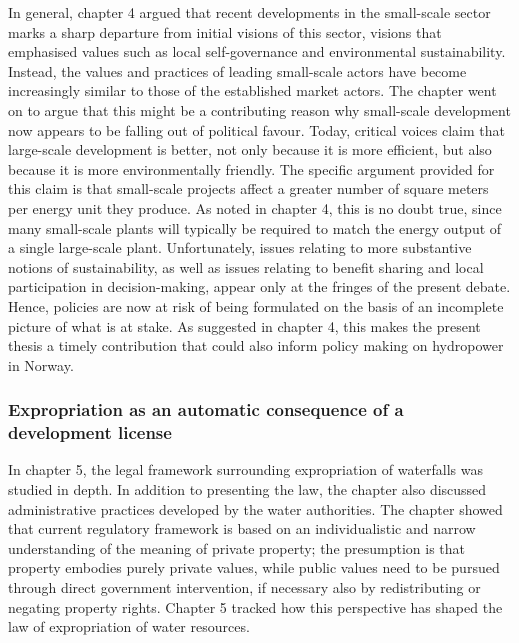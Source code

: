 In general, chapter 4 argued that recent developments in the small-scale sector marks a sharp departure from initial visions of this sector, visions that emphasised values such as local self-governance and environmental sustainability. Instead, the values and practices of leading small-scale actors have become increasingly similar to those of the established market actors. The chapter went on to argue that this might be a contributing reason why small-scale development now appears to be falling out of political favour. Today, critical voices claim that large-scale development is better, not only because it is more efficient, but also because it is more environmentally friendly. The specific argument provided for this claim is that small-scale projects affect a greater number of square meters per energy unit they produce. As noted in chapter 4, this is no doubt true, since many small-scale plants will typically be required to match the energy output of a single large-scale plant. Unfortunately, issues relating to more substantive notions of sustainability, as well as issues relating to benefit sharing and local participation in decision-making, appear only at the fringes of the present debate. Hence, policies are now at risk of being formulated on the basis of an incomplete picture of what is at stake. As suggested in chapter 4, this makes the present thesis a timely contribution that could also inform policy making on hydropower in Norway.

\subsubsection*{Expropriation as an automatic consequence of a development license}

In chapter 5, the legal framework surrounding expropriation of waterfalls was studied in depth. In addition to presenting the law, the chapter also discussed administrative practices developed by the water authorities. The chapter showed that current regulatory framework is based on an individualistic and narrow understanding of the meaning of private property; the presumption is that property embodies purely private values, while public values need to be pursued through direct government intervention, if necessary also by redistributing or negating property rights. Chapter 5 tracked how this perspective has shaped the law of expropriation of water resources.

